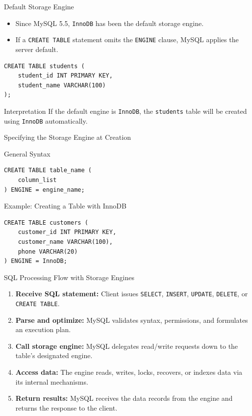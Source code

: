 \documentclass[aspectratio=169,11pt]{beamer}
\newcommand{\code}[1]{\texttt{#1}}
\newcommand{\smallitem}{\setlength{\itemsep}{2pt}}
\begin{document}
\begin{frame}[fragile]{Default Storage Engine}
\begin{itemize}\smallitem
  \item Since MySQL 5.5, \code{InnoDB} has been the default storage engine.
  \item If a \code{CREATE TABLE} statement omits the \code{ENGINE} clause, MySQL applies the server default.
\end{itemize}
\begin{lstlisting}
CREATE TABLE students (
    student_id INT PRIMARY KEY,
    student_name VARCHAR(100)
);
\end{lstlisting}
\begin{block}{Interpretation}
If the default engine is \code{InnoDB}, the \code{students} table will be created using \code{InnoDB} automatically.
\end{block}
\end{frame}

\begin{frame}[fragile]{Specifying the Storage Engine at Creation}
\begin{block}{General Syntax}
\begin{lstlisting}
CREATE TABLE table_name (
    column_list
) ENGINE = engine_name;
\end{lstlisting}
\end{block}
\begin{block}{Example: Creating a Table with InnoDB}
\begin{lstlisting}
CREATE TABLE customers (
    customer_id INT PRIMARY KEY,
    customer_name VARCHAR(100),
    phone VARCHAR(20)
) ENGINE = InnoDB;
\end{lstlisting}
\end{block}
\end{frame}

\begin{frame}{SQL Processing Flow with Storage Engines}
\begin{enumerate}\smallitem
  \item \textbf{Receive SQL statement:} Client issues \code{SELECT}, \code{INSERT}, \code{UPDATE}, \code{DELETE}, or \code{CREATE TABLE}.
  \item \textbf{Parse and optimize:} MySQL validates syntax, permissions, and formulates an execution plan.
  \item \textbf{Call storage engine:} MySQL delegates read/write requests down to the table's designated engine.
  \item \textbf{Access data:} The engine reads, writes, locks, recovers, or indexes data via its internal mechanisms.
  \item \textbf{Return results:} MySQL receives the data records from the engine and returns the response to the client.
\end{enumerate}
\end{frame}
\end{document}
